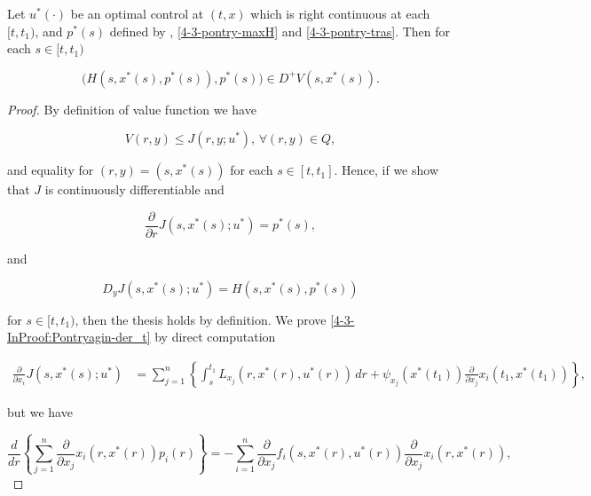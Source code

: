 \begin{theorem}
    Let $u^{\ast}(\cdot)$ be an optimal control at $(t,x)$ which is right continuous at each $[t,t_1)$, and $p^{\ast}(s)$ defined by \label{4-3-pontrydotp}, \ref{4-3-pontry-maxH} and \ref{4-3-pontry-tras}. 
    Then for each $s\in[t,t_1)$ 
    
    \begin{equation}
        \bigg(H(s,x^{\ast}(s),p^{\ast}(s)),p^{\ast}(s)\bigg) \in D^+V(s,x^{\ast}(s)).
    \end{equation}

    \begin{proof}
        By definition of value function we have

        \[V(r,y) \leq J(r,y;u^{\ast}),\,\forall (r,y)\in Q,\]

        and equality for $(r,y)=(s,x^{\ast}(s))$ for each $s\in[t,t_1]$. Hence, if we show that $J$ is continuously differentiable and

        \begin{equation}\label{4-3-InProof:Pontryagin-der_t}
            \frac{\partial}{\partial r}J(s,x^{\ast}(s);u^{\ast}) = p^{\ast}(s),
        \end{equation}

        and 

        \begin{equation}\label{4-3-InProof:Pontryagin-der_x}
            D_yJ(s,x^{\ast}(s);u^{\ast}) = H(s,x^{\ast}(s),p^{\ast}(s))
        \end{equation}

        for $s\in[t,t_1)$, then the thesis holds by definition. We prove \ref{4-3-InProof:Pontryagin-der_t} by direct computation 

        \begin{align*}
            \frac{\partial}{\partial x_i}J(s,x^{\ast}(s);u^{\ast}) & = \sum_{j=1}^n\left\{\int_s^{t_1} L_{x_j}(r,x^{\ast}(r),u^{\ast}(r))\,dr + \psi_{x_j}(x^{\ast}(t_1))\frac{\partial}{\partial x_j}x_i(t_1,x^{\ast}(t_1))\right\},
        \end{align*}

        but we have
        
        \begin{equation}
            \frac{d}{dr}\left\{\sum_{j=1}^n \frac{\partial}{\partial x_j}x_i(r,x^{\ast}(r))p_i(r) \right\} = - \sum_{i=1}^n \frac{\partial}{\partial x_{j}}f_i(s,x^{\ast}(r),u^{\ast}(r))\frac{\partial}{\partial x_j}x_i(r,x^{\ast}(r)),
        \end{equation}


\end{proof}
\end{theorem}
